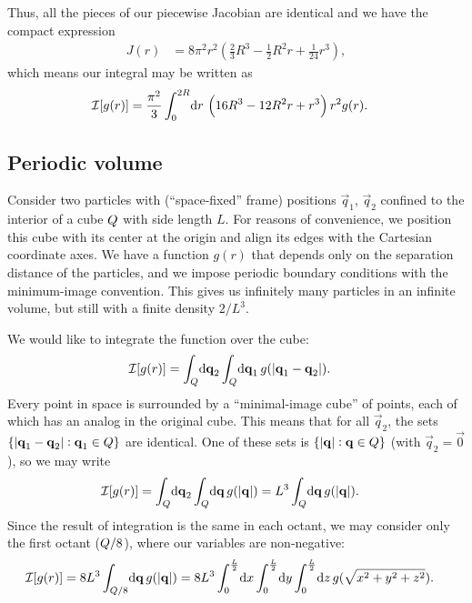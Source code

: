 Thus, all the pieces of our piecewise Jacobian are identical and we have the compact expression
\begin{align}
	J(r)
	&= 8 \pi^2 r^2 \left( \frac{2}{3} R^3 - \frac{1}{2} R^2 r + \frac{1}{24} r^3 \right),
\end{align}
which means our integral may be written as
\begin{align}
	\mathcal{I}[g(r)]
	&= \frac{\pi^2}{3} \int_0^{2 R}\! \dif r \, \left( 16 R^3 - 12 R^2 r + r^3 \right) r^2 g(r).
\end{align}


\subsection{Periodic volume}

Consider two particles with (``space-fixed'' frame) positions $\vec{q}_1$, $\vec{q}_2$ confined to the interior of a cube $Q$ with side length $L$.
For reasons of convenience, we position this cube with its center at the origin and align its edges with the Cartesian coordinate axes.
We have a function $g(r)$ that depends only on the separation distance of the particles, and we impose periodic boundary conditions with the minimum-image convention.
This gives us infinitely many particles in an infinite volume, but still with a finite density $2/L^3$.

We would like to integrate the function over the cube:
\begin{align}
	\mathcal{I}[g(r)]
	&= \int_\cube\! \dif \vec{q}_2 \int_\cube\! \dif \vec{q}_1 \, g(\abs[0]{\vec{q}_1 - \vec{q}_2}).
\end{align}
Every point in space is surrounded by a ``minimal-image cube'' of points, each of which has an analog in the original cube.
This means that for all $\vec{q}_2$, the sets $\{ \abs[0]{\bm{\mathbf{q}}_1 - \bm{\mathbf{q}}_2} : \bm{\mathbf{q}}_1 \in Q \}$ are identical.
One of these sets is $\{ \abs[0]{\bm{\mathbf{q}}} : \bm{\mathbf{q}} \in Q \}$ (with $\vec{q}_2 = \vec{0}$), so we may write
\begin{align}
	\mathcal{I}[g(r)]
	&= \int_\cube\! \dif \vec{q}_2 \int_\cube\! \dif \vec{q} \, g(\abs[0]{\vec{q}})
	= L^3 \int_\cube\! \dif \vec{q} \, g(\abs[0]{\vec{q}}).
\end{align}
Since the result of integration is the same in each octant, we may consider only the first octant ($Q/8$), where our variables are non-negative:
\begin{align*}
	\mathcal{I}[g(r)]
	&= 8 L^3 \int_{\cube/8}\! \dif \vec{q} \, g(\abs[0]{\vec{q}})
	= 8 L^3 \int_0^{\frac{L}{2}}\! \dif x \int_0^{\frac{L}{2}}\! \dif y \int_0^{\frac{L}{2}}\! \dif z \, g(\sqrt{x^2 + y^2 + z^2}).
\end{align*}


